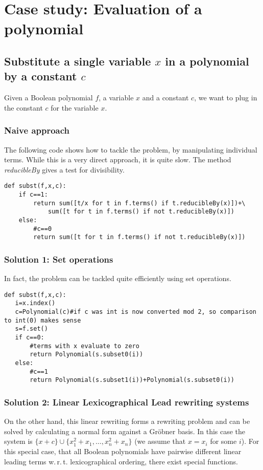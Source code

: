 \documentclass[]{article}
\newcommand{\Groebner}{Gr\"{o}bner\xspace}
\newcommand{\functionname}[1]{\textit{#1}\xspace}
\newcommand{\explfieldequations}{{x_1^2+x_1,\ldots,x_n^2+x_n}}
\begin{document}
\section{Case study: Evaluation of a polynomial}

\subsection{Substitute a single variable $x$ in a polynomial by a constant $c$}

Given a Boolean polynomial $f$, a variable $x$ and a constant $c$, we want to plug in the constant $c$ for the variable $x$.

\subsubsection{Naive approach}
The following code shows how to tackle the problem, by manipulating individual terms.
While this is a very direct approach, it is quite slow.
The method \functionname{reducibleBy} gives a test for divisibility.
\begin{verbatim}
def subst(f,x,c):
    if c==1:
        return sum([t/x for t in f.terms() if t.reducibleBy(x)])+\
            sum([t for t in f.terms() if not t.reducibleBy(x)])
    else:
        #c==0
        return sum([t for t in f.terms() if not t.reducibleBy(x)])

\end{verbatim}

\subsubsection{Solution 1: Set operations}
In fact, the problem can be tackled quite efficiently using set operations.
\begin{verbatim}
def subst(f,x,c):
   i=x.index()
   c=Polynomial(c)#if c was int is now converted mod 2, so comparison to int(0) makes sense
   s=f.set()
   if c==0:
       #terms with x evaluate to zero
       return Polynomial(s.subset0(i))
   else:
       #c==1
       return Polynomial(s.subset1(i))+Polynomial(s.subset0(i))    
\end{verbatim}

\subsubsection{Solution 2: Linear Lexicographical Lead rewriting systems}
On the other hand, this linear rewriting forms a rewriting problem and can be solved by calculating a normal form against a \Groebner 
basis.
In this case the system is $\{x+c\} \cup \{\explfieldequations\}$ (we assume that $x=x_i$ for some $i$).
For this special case, that all Boolean polynomials have pairwise different linear leading terms w.\,r.\,t. lexicographical ordering,
there exist special functions.
\end{document}
